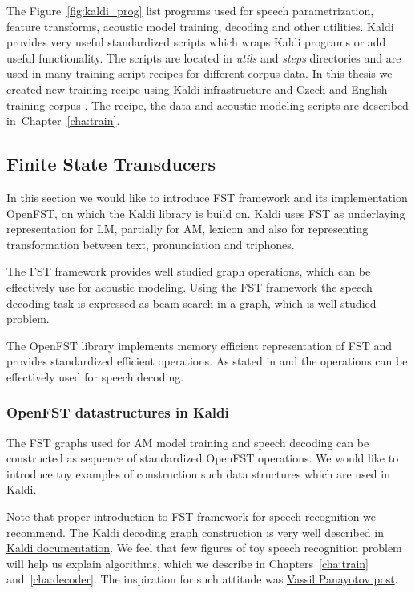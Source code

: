 The Figure~\ref{fig:kaldi_prog} list programs used for speech parametrization, feature transforms, acoustic model
training, decoding and other utilities. Kaldi provides very useful standardized scripts which wraps
Kaldi programs or add useful functionality. The scripts are located in {\it utils} and {\it steps}
directories and are used in many training script recipes for different corpus data.
In this thesis we created new training recipe using Kaldi infrastructure and
Czech and English training corpus \cite{korvas_2014}.
The recipe, the data and acoustic modeling scripts are described in~Chapter~\ref{cha:train}.

\subsection{Finite State Transducers} 
\label{sec:fst}
In this section we would like to introduce \acl{FST} framework and its
implementation OpenFST, on which the Kaldi library is build on. 
Kaldi uses \ac{FST} as underlaying representation for \ac{LM}, partially for \ac{AM}, lexicon and 
also for representing transformation between text, pronunciation and triphones.

The \ac{FST} framework provides well studied graph operations\cite{mohri2002weighted},
which can be effectively use for acoustic modeling.
Using the \ac{FST} framework the speech decoding task is expressed as
beam search in a graph, which is well studied problem.

The OpenFST library implements memory efficient representation of \ac{FST} and
provides standardized efficient operations.
As stated in \cite{mohri2002weighted} and \cite{povey2011kaldi} the operations can be effectively used
for speech decoding. 

\subsubsection*{OpenFST datastructures in Kaldi}
The \ac{FST} graphs used for \ac{AM} model training and speech decoding
can be constructed as sequence of standardized OpenFST operations.
We would like to introduce toy examples of construction such data structures which are used in Kaldi.

Note that proper introduction to \ac{FST} framework for speech recognition we recommend\cite{mohri2002weighted}.
The Kaldi decoding graph construction is very well described in \href{http://kaldi.sourceforge.net/graph\_recipe\_test.html}{Kaldi documentation}.
We feel that few figures of toy speech recognition problem will help us explain algorithms,
which we describe in Chapters~\ref{cha:train} and~\ref{cha:decoder}.
The inspiration for such attitude was \href{http://vpanayotov.blogspot.cz/2012/06/kaldi-decoding-graph-construction.html}{Vassil Panayotov post}.

